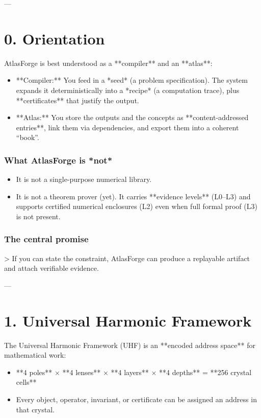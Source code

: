 \documentclass[11pt]{article}
\begin{document}
---

\section{0. Orientation}

AtlasForge is best understood as a **compiler** and an **atlas**:

\begin{itemize}
\item **Compiler:** You feed in a *seed* (a problem specification). The system expands it deterministically into a *recipe* (a computation trace), plus **certificates** that justify the output.
\item **Atlas:** You store the outputs and the concepts as **content-addressed entries**, link them via dependencies, and export them into a coherent “book”.
\end{itemize}

\subsubsection{What AtlasForge is *not*}
\begin{itemize}
\item It is not a single-purpose numerical library.
\item It is not a theorem prover (yet). It carries **evidence levels** (L0–L3) and supports certified numerical enclosures (L2) even when full formal proof (L3) is not present.
\end{itemize}

\subsubsection{The central promise}
> If you can state the constraint, AtlasForge can produce a replayable artifact and attach verifiable evidence.

---

\section{1. Universal Harmonic Framework}

The Universal Harmonic Framework (UHF) is an **encoded address space** for mathematical work:

\begin{itemize}
\item **4 poles** × **4 lenses** × **4 layers** × **4 depths** = **256 crystal cells**
\item Every object, operator, invariant, or certificate can be assigned an address in that crystal.
\end{itemize}
\end{document}
